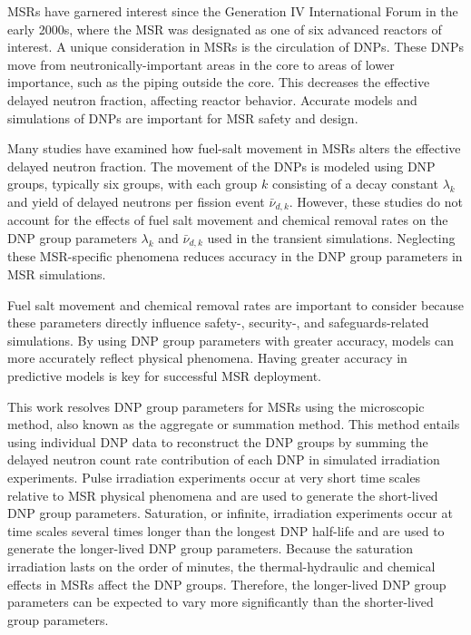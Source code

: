 \Glspl{MSR} have garnered interest since the Generation IV International Forum in the early 2000s, where the \gls{MSR} was designated as one of six advanced reactors of interest.
A unique consideration in \glspl{MSR} is the circulation of \glspl{DNP}.
These \glspl{DNP} move from neutronically-important areas in the core to areas of lower importance, such as the piping outside the core.
This decreases the effective delayed neutron fraction, affecting reactor behavior.
Accurate models and simulations of \glspl{DNP} are important for \gls{MSR} safety and design.

Many studies have examined how fuel-salt movement in \glspl{MSR} alters the effective delayed neutron fraction.
The movement of the \glspl{DNP} is modeled using \gls{DNP} groups, typically six groups, with each group $k$ consisting of a decay constant $\lambda_k$ and yield of delayed neutrons per fission event $\bar{\nu}_{d, k}$.
However, these studies do not account for the effects of fuel salt movement and chemical removal rates on the \gls{DNP} group parameters $\lambda_k$ and $\bar{\nu}_{d, k}$ used in the transient simulations.
Neglecting these \gls{MSR}-specific phenomena reduces accuracy in the \gls{DNP} group parameters in \gls{MSR} simulations.

Fuel salt movement and chemical removal rates are important to consider because these parameters directly influence safety-, security-, and safeguards-related simulations.
By using \gls{DNP} group parameters with greater accuracy, models can more accurately reflect physical phenomena.
Having greater accuracy in predictive models is key for successful \gls{MSR} deployment.

This work resolves \gls{DNP} group parameters for \glspl{MSR} using the microscopic method, also known as the aggregate or summation method.
This method entails using individual \gls{DNP} data to reconstruct the \gls{DNP} groups by summing the delayed neutron count rate contribution of each \gls{DNP} in simulated irradiation experiments.
Pulse irradiation experiments occur at very short time scales relative to \gls{MSR} physical phenomena and are used to generate the short-lived \gls{DNP} group parameters.
Saturation, or infinite, irradiation experiments occur at time scales several times longer than the longest \gls{DNP} half-life and are used to generate the longer-lived \gls{DNP} group parameters.
Because the saturation irradiation lasts on the order of minutes, the thermal-hydraulic and chemical effects in \glspl{MSR} affect the \gls{DNP} groups.
Therefore, the longer-lived \gls{DNP} group parameters can be expected to vary more significantly than the shorter-lived group parameters.

